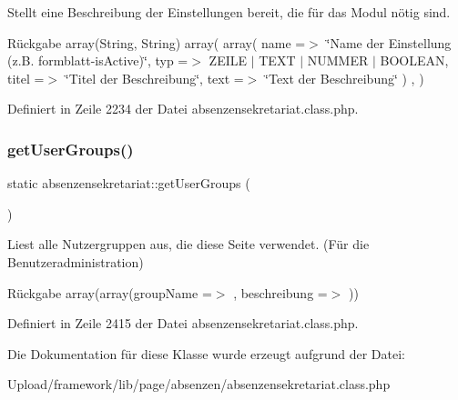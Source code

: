 Stellt eine Beschreibung der Einstellungen bereit, die für das Modul nötig sind. \begin{DoxyReturn}{Rückgabe}
array(\+String, String) array( array( \textquotesingle{}name\textquotesingle{} =$>$ \char`\"{}\+Name der Einstellung (z.\+B. formblatt-\/is\+Active)\char`\"{}, \textquotesingle{}typ\textquotesingle{} =$>$ Z\+E\+I\+LE $\vert$ T\+E\+XT $\vert$ N\+U\+M\+M\+ER $\vert$ B\+O\+O\+L\+E\+AN, \textquotesingle{}titel\textquotesingle{} =$>$ \char`\"{}\+Titel der Beschreibung\char`\"{}, \textquotesingle{}text\textquotesingle{} =$>$ \char`\"{}\+Text der Beschreibung\char`\"{} ) , ) 
\end{DoxyReturn}


Definiert in Zeile 2234 der Datei absenzensekretariat.\+class.\+php.

\mbox{\label{classabsenzensekretariat_a780e602fcc6f2c4dfdfca1cfd5556860}} 
\subsubsection{\texorpdfstring{get\+User\+Groups()}{getUserGroups()}}
{\footnotesize\ttfamily static absenzensekretariat\+::get\+User\+Groups (\begin{DoxyParamCaption}{ }\end{DoxyParamCaption})\hspace{0.3cm}{\ttfamily [static]}}

Liest alle Nutzergruppen aus, die diese Seite verwendet. (Für die Benutzeradministration) \begin{DoxyReturn}{Rückgabe}
array(array(\textquotesingle{}group\+Name\textquotesingle{} =$>$ \textquotesingle{}\textquotesingle{}, \textquotesingle{}beschreibung\textquotesingle{} =$>$ \textquotesingle{}\textquotesingle{})) 
\end{DoxyReturn}


Definiert in Zeile 2415 der Datei absenzensekretariat.\+class.\+php.



Die Dokumentation für diese Klasse wurde erzeugt aufgrund der Datei\+:\begin{DoxyCompactItemize}
\item 
Upload/framework/lib/page/absenzen/absenzensekretariat.\+class.\+php\end{DoxyCompactItemize}
